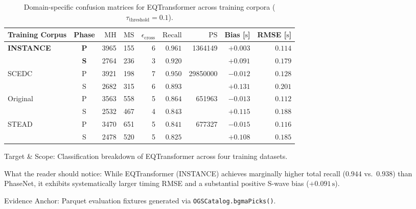 \begin{table}[htbp]
  \centering
  \small
  \caption{Domain-specific confusion matrices for EQTransformer across training corpora ($\tau_{\mathrm{threshold}} = 0.1$).}
  \label{tab:eqt_confmtx_datasets}
  \begin{threeparttable}
    \begin{tabularx}{\linewidth}{l c r r r r r r r}
      \toprule
      \textbf{Training Corpus} & \textbf{Phase} & $\mathrm{MH}$ & $\mathrm{MS}$ & $\epsilon_{\mathrm{cross}}$ & $\mathrm{Recall}$ & $\mathrm{PS}$ & \textbf{Bias [$\unit{\second}$]} & \textbf{RMSE [$\unit{\second}$]} \\
      \midrule
      \multirow{2}{*}{\textbf{INSTANCE}} & \textbf{P} & \num{3965} & \num{155} & \num{6} & $\mathbf{0.961}$ & \multirow{2}{*}{\num{1364149}} & $+0.003$ & $0.114$ \\
      & \textbf{S} & \num{2764} & \num{236} & \num{3} & $\mathbf{0.920}$ & & $+0.091$ & $0.179$ \\
      \midrule
      \multirow{2}{*}{SCEDC} & P & \num{3921} & \num{198} & \num{7} & $0.950$ & \multirow{2}{*}{\num{29850000}} & $-0.012$ & $0.128$ \\
      & S & \num{2682} & \num{315} & \num{6} & $0.893$ & & $+0.131$ & $0.201$ \\
      \midrule
      \multirow{2}{*}{Original} & P & \num{3563} & \num{558} & \num{5} & $0.864$ & \multirow{2}{*}{\num{651963}} & $-0.013$ & $0.112$ \\
      & S & \num{2532} & \num{467} & \num{4} & $0.843$ & & $+0.115$ & $0.188$ \\
      \midrule
      \multirow{2}{*}{STEAD} & P & \num{3470} & \num{651} & \num{5} & $0.841$ & \multirow{2}{*}{\num{677327}} & $-0.015$ & $0.116$ \\
      & S & \num{2478} & \num{520} & \num{5} & $0.825$ & & $+0.108$ & $0.185$ \\
      \bottomrule
    \end{tabularx}
    \begin{tablenotes}[flushleft]
      \footnotesize
      \item Target \& Scope: Classification breakdown of EQTransformer across four training datasets.
      \item What the reader should notice: While EQTransformer (INSTANCE) achieves marginally higher total recall ($0.944$ vs.\ $0.938$) than PhaseNet, it exhibits systematically larger timing RMSE and a substantial positive S-wave bias ($+0.091\,\unit{\second}$).
      \item Evidence Anchor: Parquet evaluation fixtures generated via \texttt{OGSCatalog.bgmaPicks()}.
    \end{tablenotes}
  \end{threeparttable}
\end{table}

